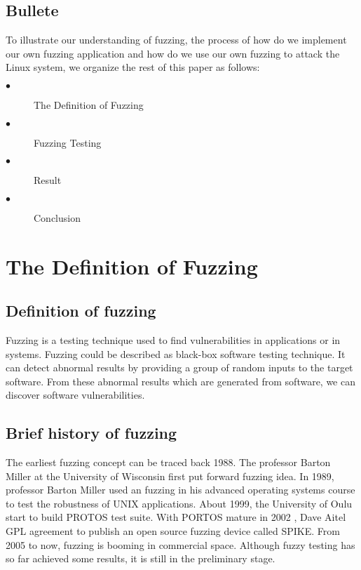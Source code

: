 \documentclass[twoside]{article}
\begin{document}
\begin{multicols}{2}
\subsection{Bullete}
To illustrate our understanding of fuzzing, the process of how do we implement our own fuzzing application and how do we use our own fuzzing to attack the Linux system, we organize the rest of this paper as follows:
\begin{description}
\item[$\bullet$] The Definition of Fuzzing
\item[$\bullet$] Fuzzing Testing
\item[$\bullet$] Result
\item[$\bullet$] Conclusion
\end{description}
\section{The Definition of Fuzzing}
\subsection{Definition of fuzzing}
Fuzzing is a testing technique used to find vulnerabilities in applications or in systems.\cite{sutton2007fuzzing} Fuzzing could be described as black-box software testing technique.\cite{rathaus2011open} It can detect abnormal results by providing a group of random inputs to the target software. From these abnormal results which are generated from software, we can discover software vulnerabilities.
\subsection{Brief history of fuzzing}
The earliest fuzzing concept can be traced back 1988.\cite{takanen2009fuzzing} The professor Barton Miller at the University of Wisconsin first put forward fuzzing idea. In 1989, professor Barton Miller used an fuzzing in his advanced operating systems course to test the robustness of UNIX applications.  About 1999, the University of Oulu start to build PROTOS test suite. With PORTOS mature in 2002 , Dave Aitel GPL agreement to publish an open source fuzzing device called SPIKE. From 2005 to now, fuzzing is booming in commercial space. Although fuzzy testing has so far achieved some results, it is still in the preliminary stage.\cite{takanen2009fuzzing}

\end{multicols}
\end{document}
